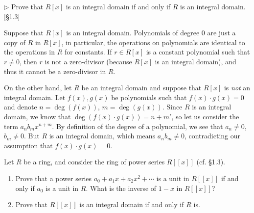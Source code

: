\begin{problem}
	$\triangleright$ Prove that $R[x]$ is an integral domain if and only if $R$ is an integral domain. [\S 1.3]
\end{problem}

\begin{solution}
	Suppose that $R[x]$ is an integral domain. Polynomials of degree $0$ are just a copy of $R$ in $R[x]$, in particular, the operations on polynomials are identical to the operations in $R$ for constants. If $r \in R[x]$ is a constant polynomial such that $r \neq 0$, then $r$ is not a zero-divisor (because $R[x]$ is an integral domain), and thus it cannot be a zero-divisor in $R$.
	
	On the other hand, let $R$ be an integral domain and suppose that $R[x]$ is \emph{not} an integral domain. Let $f(x), g(x)$ be polynomials such that $f(x) \cdot g(x) = 0$ and denote $n = \deg(f(x))$, $m = \deg(g(x))$. Since $R$ is an integral domain, we know that $\deg(f(x) \cdot g(x)) = n + m'$, so let us consider the term $a_n b_m x^{n + m}$. By definition of the degree of a polynomial, we see that $a_n \neq 0$, $b_m \neq 0$. But $R$ is an integral domain, which means $a_n b_m \neq 0$, contradicting our assumption that $f(x) \cdot g(x) = 0$.
\end{solution}

\begin{problem}
	Let $R$ be a ring, and consider the ring of power series $R[[x]]$ (cf. \S1.3).
	\begin{enumerate}[label=(\roman*)]
		\item Prove that a power series $a_0 + a_1 x + a_2 x^2 + \cdots$ is a unit in $R[[x]]$ if and only if $a_0$ is a unit in $R$. What is the inverse of $1 - x$ in $R[[x]]$?
		\item Prove that $R[[x]]$ is an integral domain if and only if $R$ is.
	\end{enumerate}
\end{problem}

